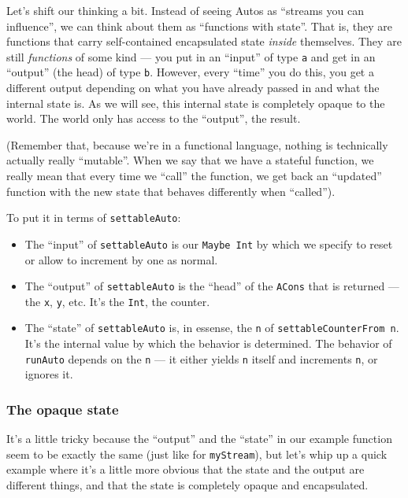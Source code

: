 \documentclass[]{article}
\begin{document}
Let's shift our thinking a bit. Instead of seeing Autos as ``streams you
can influence'', we can think about them as ``functions with state''.
That is, they are functions that carry self-contained encapsulated state
\emph{inside} themselves. They are still \emph{functions} of some kind
--- you put in an ``input'' of type \texttt{a} and get in an ``output''
(the head) of type \texttt{b}. However, every ``time'' you do this, you
get a different output depending on what you have already passed in and
what the internal state is. As we will see, this internal state is
completely opaque to the world. The world only has access to the
``output'', the result.

(Remember that, because we're in a functional language, nothing is
technically actually really ``mutable''. When we say that we have a
stateful function, we really mean that every time we ``call'' the
function, we get back an ``updated'' function with the new state that
behaves differently when ``called'').

To put it in terms of \texttt{settableAuto}:

\begin{itemize}
\tightlist
\item
  The ``input'' of \texttt{settableAuto} is our \texttt{Maybe\ Int} by
  which we specify to reset or allow to increment by one as normal.
\item
  The ``output'' of \texttt{settableAuto} is the ``head'' of the
  \texttt{ACons} that is returned --- the \texttt{x}, \texttt{y}, etc.
  It's the \texttt{Int}, the counter.
\item
  The ``state'' of \texttt{settableAuto} is, in essense, the \texttt{n}
  of \texttt{settableCounterFrom\ n}. It's the internal value by which
  the behavior is determined. The behavior of \texttt{runAuto} depends
  on the \texttt{n} --- it either yields \texttt{n} itself and
  increments \texttt{n}, or ignores it.
\end{itemize}

\subsubsection{The opaque state}\label{the-opaque-state}

It's a little tricky because the ``output'' and the ``state'' in our
example function seem to be exactly the same (just like for
\texttt{myStream}), but let's whip up a quick example where it's a
little more obvious that the state and the output are different things,
and that the state is completely opaque and encapsulated.
\end{document}
